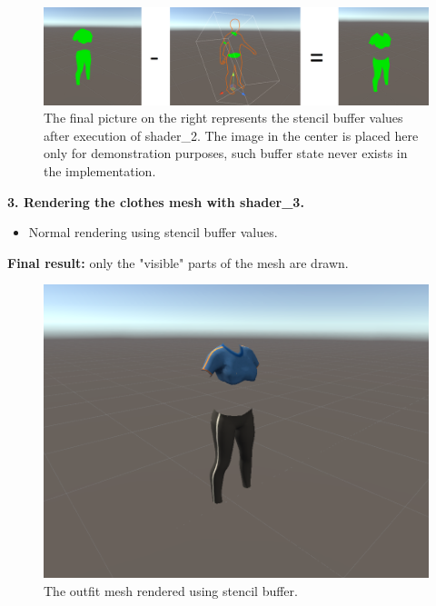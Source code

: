 \documentclass[a4paper]{report}
\begin{document}
 \begin{figure}[H]
  \includegraphics[width=\textwidth, keepaspectratio]{images/ClothesDemos/3_outfit_-_cutted_body_result_new.png}
  \caption{The final picture on the right represents the stencil buffer values after execution of shader\_2. The image in the center is placed here only for demonstration purposes, such buffer state never exists in the implementation.} 
  \label{fig:stencil_sh_1}
\end{figure}




\textbf{3. Rendering the clothes mesh with shader\_3.}

\begin{itemize}
    \item Normal rendering using stencil buffer values.
\end{itemize}

\textbf{Final result:} only the "visible" parts of the mesh are drawn. 


 \begin{figure}[H]
  \includegraphics[width=\textwidth, keepaspectratio]{images/ClothesDemos/4_render_outfit_using_result_stencil.png.png.png}
  \caption{The outfit mesh rendered using stencil buffer.} 
  \label{fig:stencil_sh_1}
\end{figure}
\end{document}
